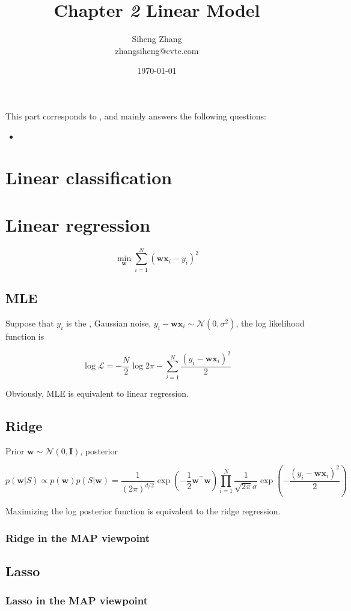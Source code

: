 \documentclass{article}
\author{Siheng Zhang\\zhangsiheng@cvte.com}
\title{Chapter \textbf{\textit{2}} Linear Model}
\date{\today}
\begin{document}
\maketitle  

This part corresponds to , and mainly answers the following questions:

\begin{itemize}
\item 
\end{itemize}

\tableofcontents
\newpage

\section{Linear classification}

\section{Linear regression}

	\begin{equation}
	\min_\mathbf{w} \sum_{i=1}^N (\mathbf{wx}_i - y_i)^2 
	\end{equation}

\subsection{MLE}

	Suppose that $y_i$ is the , Gaussian noise, $y_i-\mathbf{wx}_i \sim\mathcal{N}(0,\sigma^2)$, the log likelihood function is
	
	\begin{equation}
	\log \mathcal{L} = -\frac{N}{2} \log 2\pi - \sum_{i=1}^N \frac{(y_i-\mathbf{wx}_i)^2}{2}
	\end{equation}

Obviously, MLE is equivalent to linear regression.

\subsection{Ridge}

	Prior $\mathbf{w}\sim\mathcal{N}(0,\mathbf{I})$, posterior
	
	\begin{equation}
	p(\mathbf{w}|S) \propto p(\mathbf{w}) p(S|\mathbf{w}) = \frac{1}{(2\pi)^{d/2}} \exp \left( -\frac{1}{2} \mathbf{w}^\top \mathbf{w} \right) \prod_{i=1}^N \frac{1}{\sqrt{2\pi}\sigma} \exp \left( -\frac{(y_i-\mathbf{wx}_i)^2}{2} \right)
	\end{equation}
	
Maximizing the log posterior function is equivalent to the ridge regression.
	
\subsubsection{Ridge in the MAP viewpoint}

\subsection{Lasso}

\subsubsection{Lasso in the MAP viewpoint}
\end{document}
